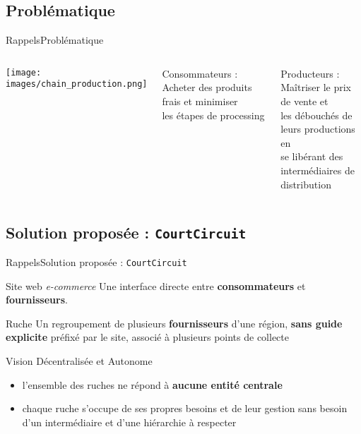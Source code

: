 \documentclass[usenames,dvipsnames]{beamer}
\begin{document}
\subsection{Problématique}
\begin{frame}{Rappels}{Problématique}
\begin{columns}[onlytextwidth, T]
  \column{50mm}
    \texttt{[image: images/chain\_production.png]}

  \column{\dimexpr\linewidth-35mm-4mm}
    \begin{block}{Consommateurs :}
    Acheter des produits frais et minimiser \\les étapes de processing
    \end{block}

    \begin{block}{Producteurs :}
    Maîtriser le prix de vente et \\les débouchés de leurs productions en \\se libérant des intermédiaires de distribution
    \end{block}
\end{columns}
\end{frame}

\subsection{Solution proposée : \texttt{CourtCircuit}}
\begin{frame}{Rappels}{Solution proposée : \texttt{CourtCircuit}}
  \begin{block}{Site web \textit{e-commerce}}
  Une interface directe entre \textbf{consommateurs} et \textbf{fournisseurs}.
  \end{block}

  \begin{block}{Ruche}
  Un regroupement de plusieurs \textbf{fournisseurs} d'une région, \textbf{sans guide explicite} préfixé par le site, associé à plusieurs points de collecte
  \end{block}

  \begin{block}{Vision Décentralisée et Autonome}
  \begin{itemize}
    \item l'ensemble des ruches ne répond à \textbf{aucune entité centrale}
    \item chaque ruche s'occupe de ses propres besoins et de leur gestion sans besoin d'un intermédiaire et d'une hiérarchie à respecter
  \end{itemize}
  \end{block}
\end{frame}
\end{document}
